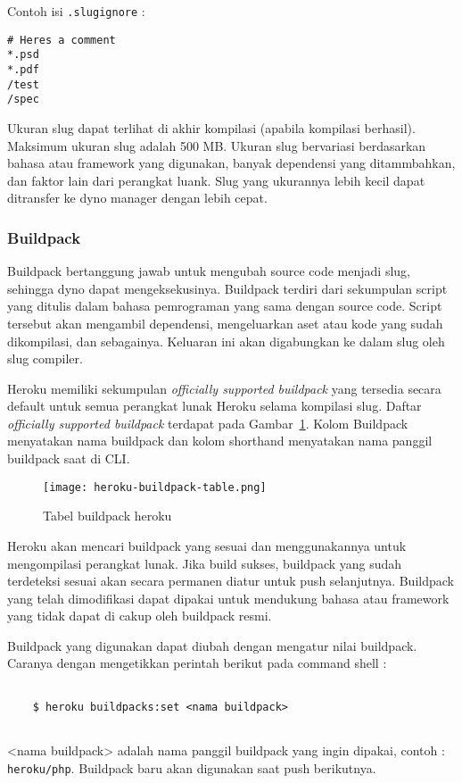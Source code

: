 Contoh isi \texttt{.slugignore} :
\begin{lstlisting}
# Heres a comment
*.psd
*.pdf
/test
/spec
\end{lstlisting}

Ukuran slug dapat terlihat di akhir kompilasi (apabila kompilasi berhasil). Maksimum ukuran slug adalah 500 MB. Ukuran slug bervariasi berdasarkan bahasa atau framework yang digunakan, banyak dependensi yang ditammbahkan, dan faktor lain dari perangkat luank. Slug yang ukurannya lebih kecil dapat ditransfer ke dyno manager dengan lebih cepat.

\subsubsection{Buildpack}
Buildpack bertanggung jawab untuk mengubah source code menjadi slug, sehingga dyno dapat mengeksekusinya. Buildpack terdiri dari sekumpulan script yang ditulis dalam bahasa pemrograman yang sama dengan source code. Script tersebut akan mengambil dependensi, mengeluarkan aset atau kode yang sudah dikompilasi, dan sebagainya. Keluaran ini akan digabungkan ke dalam slug oleh slug compiler.

Heroku memiliki sekumpulan \textit{officially supported buildpack} yang tersedia secara default untuk semua perangkat lunak Heroku selama kompilasi slug. Daftar \textit{officially supported buildpack} terdapat pada Gambar~\ref{fig:heroku-buildpack-table}. Kolom Buildpack menyatakan nama buildpack dan kolom shorthand menyatakan nama panggil buildpack saat di CLI.

\begin{figure}[H]
	\centering  
	\texttt{[image: heroku-buildpack-table.png]}  
	\caption[Tabel buildpack heroku]{Tabel buildpack heroku} 
	\label{fig:heroku-buildpack-table} 
\end{figure}

Heroku akan mencari buildpack yang sesuai dan menggunakannya untuk mengompilasi perangkat lunak. Jika build sukses, buildpack yang sudah terdeteksi sesuai akan secara permanen diatur untuk push selanjutnya. Buildpack yang telah dimodifikasi dapat dipakai untuk mendukung bahasa atau framework yang tidak dapat di cakup oleh buildpack resmi.

Buildpack yang digunakan dapat diubah dengan mengatur nilai buildpack. Caranya dengan mengetikkan perintah berikut pada command shell :
\begin{lstlisting}

	$ heroku buildpacks:set <nama buildpack>
	
\end{lstlisting}
<nama buildpack> adalah nama panggil buildpack yang ingin dipakai, contoh : \texttt{heroku/php}. Buildpack baru akan digunakan saat push berikutnya. 

